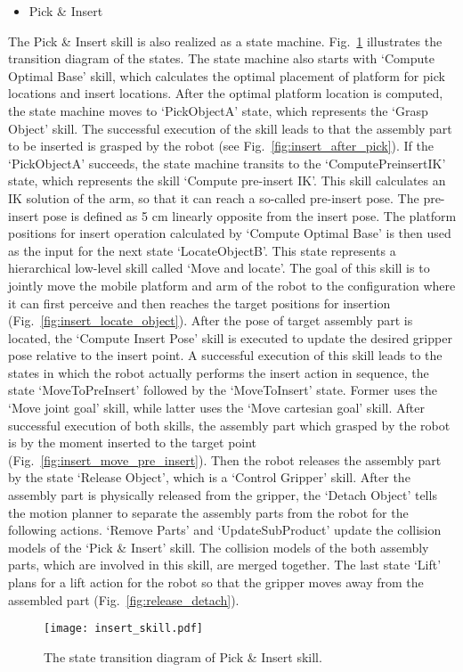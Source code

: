 \begin{itemize}
\item Pick \& Insert 
\end{itemize}
The Pick \& Insert skill is also realized as a state machine. Fig.~\ref{fig:insert_skill} illustrates the transition diagram of the states. The state machine also starts with `Compute Optimal Base' skill, which calculates the optimal placement of platform for  pick locations and insert locations. After the optimal platform location is computed, the state machine moves to `PickObjectA' state, which represents the `Grasp Object' skill. The successful execution of the skill leads to that the assembly part to be inserted is grasped by the robot (see Fig.~\ref{fig:insert_after_pick}). If the `PickObjectA' succeeds, the state machine transits to the `ComputePreinsertIK' state, which represents the skill `Compute pre-insert IK'. This skill calculates an IK solution of the arm, so that it can reach a so-called pre-insert pose. The pre-insert pose is defined as 5 cm linearly opposite from the insert pose. The platform positions for insert operation calculated by `Compute Optimal Base' is then used as the input for the next state `LocateObjectB'. This state represents a hierarchical low-level skill called `Move and locate'. The goal of this skill is to jointly move the mobile platform and arm of the robot to the configuration where it can first perceive and then reaches the target positions for insertion (Fig.~\ref{fig:insert_locate_object}). After the pose of target assembly part is located, the `Compute Insert Pose' skill is executed to update the desired gripper pose relative to the insert point. A successful execution of this skill leads to the states in which the robot actually performs the insert action in sequence, the state `MoveToPreInsert' followed by the `MoveToInsert' state. Former uses the `Move joint goal' skill, while latter uses the `Move cartesian goal' skill. After successful execution of both skills, the assembly part which grasped by the robot is by the moment inserted to the target point (Fig.~\ref{fig:insert_move_pre_insert}). Then the robot releases the assembly part by the state `Release Object', which is a `Control Gripper' skill. After the assembly part is physically released from the gripper, the `Detach Object' tells the motion planner to separate the assembly parts from the robot for the following actions. `Remove Parts' and `UpdateSubProduct' update the collision models of the `Pick \& Insert' skill. The collision models of the both assembly parts, which are involved in this skill, are merged together. The last state `Lift' plans for a lift action for the robot so that the gripper moves away from the assembled part (Fig.~\ref{fig:release_detach}).
\begin{figure}[!htbp]
\centering
\texttt{[image: insert\_skill.pdf]}
\captionsetup{justification=raggedright}
\caption{The state transition diagram of Pick \& Insert skill.}
\label{fig:insert_skill}
\end{figure}

